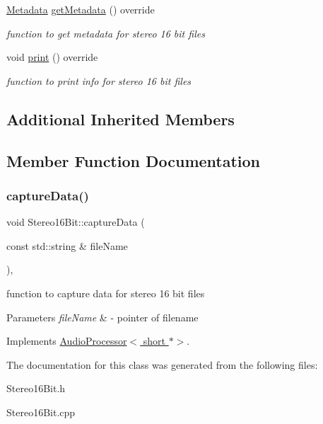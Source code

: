 \begin{DoxyCompactItemize}
\mbox{\label{classStereo16Bit_a54c03f77843900fb7bdd84bcf1903eca}} 
\hyperlink{structMetadata}{Metadata} \hyperlink{classStereo16Bit_a54c03f77843900fb7bdd84bcf1903eca}{get\+Metadata} () override
\begin{DoxyCompactList}\small\item\em function to get metadata for stereo 16 bit files \end{DoxyCompactList}\item 
\mbox{\label{classStereo16Bit_a3e568e8260c94662c82d3f90570af6ac}} 
void \hyperlink{classStereo16Bit_a3e568e8260c94662c82d3f90570af6ac}{print} () override
\begin{DoxyCompactList}\small\item\em function to print info for stereo 16 bit files \end{DoxyCompactList}\end{DoxyCompactItemize}
\subsection*{Additional Inherited Members}


\subsection{Member Function Documentation}
\mbox{\label{classStereo16Bit_a74c0ba8999456fab1de7e035e2225fa9}} 
\subsubsection{\texorpdfstring{capture\+Data()}{captureData()}}
{\footnotesize\ttfamily void Stereo16\+Bit\+::capture\+Data (\begin{DoxyParamCaption}\item[{const std\+::string \&}]{file\+Name }\end{DoxyParamCaption})\hspace{0.3cm}{\ttfamily [override]}, {\ttfamily [virtual]}}



function to capture data for stereo 16 bit files 


\begin{DoxyParams}{Parameters}
{\em file\+Name} & -\/ pointer of filename \\
\hline
\end{DoxyParams}


Implements \hyperlink{classAudioProcessor_a0d6d6ef552e671405150d2cfbd4095c5}{Audio\+Processor$<$ short $\ast$$>$}.



The documentation for this class was generated from the following files\+:\begin{DoxyCompactItemize}
\item 
Stereo16\+Bit.\+h\item 
Stereo16\+Bit.\+cpp\end{DoxyCompactItemize}
